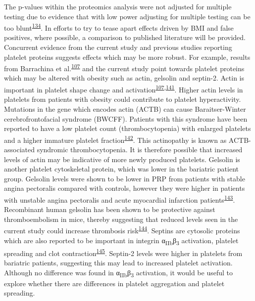 \documentclass[11pt,twoside]{bristolthesis}
\begin{document}
The p-values within the proteomics analysis were not adjusted for multiple testing due to evidence that with low power adjusting for multiple testing can be too blunt\textsuperscript{\protect\hyperlink{ref-Pascovici2016}{134}}. In efforts to try to tease apart effects driven by BMI and false positives, where possible, a comparison to published literature will be provided. Concurrent evidence from the current study and previous studies reporting platelet proteins suggests effects which may be more robust. For example, results from Barrachina et al.\textsuperscript{\protect\hyperlink{ref-Barrachina2019}{107}} and the current study point towards platelet proteins which may be altered with obesity such as actin, gelsolin and septin-2. Actin is important in platelet shape change and activation\textsuperscript{\protect\hyperlink{ref-Barrachina2019}{107},\protect\hyperlink{ref-Bearer2002}{141}}. Higher actin levels in platelets from patients with obesity could contribute to platelet hyperactivity. Mutations in the gene which encodes actin (ACTB) can cause Baraitser-Winter cerebrofrontofacial syndrome (BWCFF). Patients with this syndrome have been reported to have a low platelet count (thrombocytopenia) with enlarged platelets and a higher immature platelet fraction\textsuperscript{\protect\hyperlink{ref-Latham2018}{142}}. This actinopathy is known as ACTB-associated syndromic thrombocytopenia. It is therefore possible that increased levels of actin may be indicative of more newly produced platelets. Gelsolin is another platelet cytoskeletal protein, which was lower in the bariatric patient group. Gelsolin levels were shown to be lower in PRP from patients with stable angina pectoralis compared with controls, however they were higher in patients with unstable angina pectoralis and acute myocardial infarction patients\textsuperscript{\protect\hyperlink{ref-Yue2011}{143}}. Recombinant human gelsolin has been shown to be protective against thromboembolism in mice, thereby suggesting that reduced levels seen in the current study could increase thrombosis risk\textsuperscript{\protect\hyperlink{ref-Gupta2019}{144}}. Septins are cytosolic proteins which are also reported to be important in integrin α\textsubscript{IIb}β\textsubscript{3} activation, platelet spreading and clot contraction\textsuperscript{\protect\hyperlink{ref-Kim2020}{145}}. Septin-2 levels were higher in platelets from bariatric patients, suggesting this may lead to increased platelet activation. Although no difference was found in α\textsubscript{IIb}β\textsubscript{3} activation, it would be useful to explore whether there are differences in platelet aggregation and platelet spreading.
\end{document}
